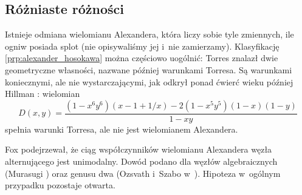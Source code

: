 
\subsection{Różniaste różności}
Istnieje odmiana wielomianu Alexandera, która liczy sobie tyle zmiennych, ile ogniw posiada splot (nie opisywaliśmy jej i~nie zamierzamy).
Klasyfikację \ref{prp:alexander_hosokawa} można częściowo uogólnić: Torres \cite{torres53} znalazł dwie geometryczne własności, nazwane później warunkami Torresa.
Są warunkami koniecznymi, ale nie wystarczającymi, jak odkrył ponad ćwierć wieku później Hillman \cite{hillman81}: wielomian
\begin{equation}
    D(x,y) = \frac{(1 - x^6y^6)(x - 1 + 1/x) - 2(1 - x^5y^5)(1 - x)(1 - y)}{1-xy}
\end{equation}
spełnia warunki Torresa, ale nie jest wielomianem Alexandera.

Fox \cite{fox62} podejrzewał, że ciąg współczynników wielomianu Alexandera węzła alternującego jest unimodalny.
%
Dowód podano dla węzłów algebraicznych (Murasugi \cite{murasugi85}) oraz genusu dwa (Ozsvath i~Szabo w~\cite{ozsvath03}).
Hipoteza w~ogólnym przypadku pozostaje otwarta.



